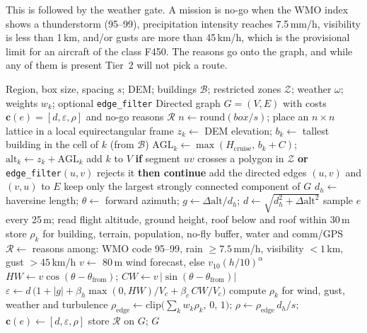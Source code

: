 This is followed by the weather gate. A mission is no-go when the WMO index shows a thunderstorm (95--99), precipitation intensity reaches 7.5\,mm/h,
visibility is less than 1\,km, and/or gusts are more than 45\,km/h, which is the
provisional limit for an aircraft of the class F450. The reasons go onto the
graph, and while any of them is present Tier~2 will not pick a route.

\begin{algorithm}[p]
\caption{Lattice airspace graph construction and costing (Module~1)}\label{alg:m1}
\begin{algorithmic}[1]
\Require Region, box size, spacing $s$; DEM; buildings $\mathcal{B}$; restricted zones $\mathcal{Z}$; weather $\omega$; weights $w_k$; optional \texttt{edge\_filter}
\Ensure Directed graph $G=(V,E)$ with costs $\mathbf{c}(e)=[d,\varepsilon,\rho]$ and no-go reasons $\mathcal{R}$
\State $n \gets \mathrm{round}(\mathit{box}/s)$; place an $n \times n$ lattice in a local equirectangular frame
 
  \State $z_k \gets$ DEM elevation; \quad $b_k \gets$ tallest building in the cell of $k$ (from $\mathcal{B}$)
  \State $\mathrm{AGL}_k \gets \max(H_\mathrm{cruise},\, b_k + C)$; \quad $\mathrm{alt}_k \gets z_k + \mathrm{AGL}_k$
   add $k$ to $V$ \EndIf
\EndFor
{} 
  \State \textbf{if} segment $uv$ crosses a polygon in $\mathcal{Z}$ \textbf{or} \texttt{edge\_filter}$(u,v)$ rejects it \textbf{then continue}
  \State add the directed edges $(u,v)$ and $(v,u)$ to $E$
\EndFor
\State keep only the largest strongly connected component of $G$
 
  \State $d_h \gets$ haversine length; \quad $\theta \gets$ forward azimuth; \quad $g \gets \Delta\mathrm{alt}/d_h$; \quad $d \gets \sqrt{d_h^2+\Delta\mathrm{alt}^2}$
  \State sample $e$ every 25\,m; read flight altitude, ground height, roof below and roof within 30\,m
  \State store $\rho_k$ for building, terrain, population, no-fly buffer, water and comm/GPS
\EndFor
\State $\mathcal{R} \gets$ reasons among: WMO code 95--99, rain $\geq 7.5$\,mm/h, visibility $< 1$\,km, gust $> 45$\,km/h
\State $v \gets$ 80\,m wind forecast, else $v_{10}(h/10)^{\alpha}$ 
  \State $H\!W \gets v\cos(\theta-\theta_\mathrm{from})$; \quad $C\!W \gets v\,\lvert\sin(\theta-\theta_\mathrm{from})\rvert$
  \State $\varepsilon \gets d\,\bigl(1+\lvert g\rvert+\beta_h\max(0,H\!W)/V_c+\beta_c\,C\!W/V_c\bigr)$ 
  \State compute $\rho_k$ for wind, gust, weather and turbulence
  \State $\rho_\mathrm{edge} \gets \mathrm{clip}\bigl(\sum_k w_k\rho_k,\,0,\,1\bigr)$; \quad $\rho \gets \rho_\mathrm{edge}\,d_h/s$; \quad $\mathbf{c}(e) \gets [d,\varepsilon,\rho]$
\EndFor
\State store $\mathcal{R}$ on $G$; \Return $G$
\end{algorithmic}
\end{algorithm}

